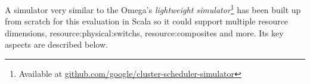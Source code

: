 A simulator very similar to the Omega's \cite{omega} \textit{lightweight simulator}\footnote[2]{\label{omega_simulator} Available at \href{https://github.com/google/cluster-scheduler-simulator}{github.com/google/cluster-scheduler-simulator}} has been built up from scratch for this evaluation in Scala \cite{scala} so it could support multiple resource dimensions, \glspl{resource:physical:switch}, \glspl{resource:composite} and more.
Its key aspects are described below.